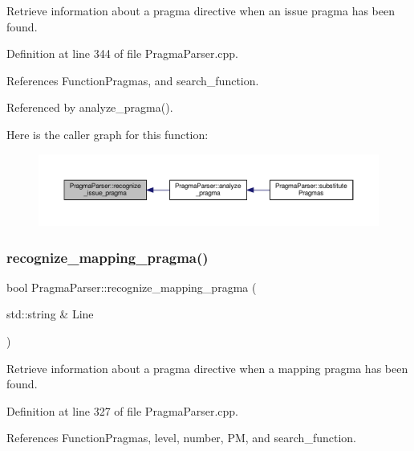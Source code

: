 Retrieve information about a pragma directive when an issue pragma has been found. 



Definition at line 344 of file Pragma\+Parser.\+cpp.



References Function\+Pragmas, and search\+\_\+function.



Referenced by analyze\+\_\+pragma().

Here is the caller graph for this function\+:
\nopagebreak
\begin{figure}[H]
\begin{center}
\leavevmode
\includegraphics[width=350pt]{d6/d6c/classPragmaParser_a21060de0d17913f42fd0b4b7472b243c_icgraph}
\end{center}
\end{figure}
\mbox{\label{classPragmaParser_a56dfb19826945b520fbfb880bf3c1442}} 
\subsubsection{\texorpdfstring{recognize\+\_\+mapping\+\_\+pragma()}{recognize\_mapping\_pragma()}}
{\footnotesize\ttfamily bool Pragma\+Parser\+::recognize\+\_\+mapping\+\_\+pragma (\begin{DoxyParamCaption}\item[{std\+::string \&}]{Line }\end{DoxyParamCaption})\hspace{0.3cm}{\ttfamily [private]}}



Retrieve information about a pragma directive when a mapping pragma has been found. 



Definition at line 327 of file Pragma\+Parser.\+cpp.



References Function\+Pragmas, level, number, PM, and search\+\_\+function.



